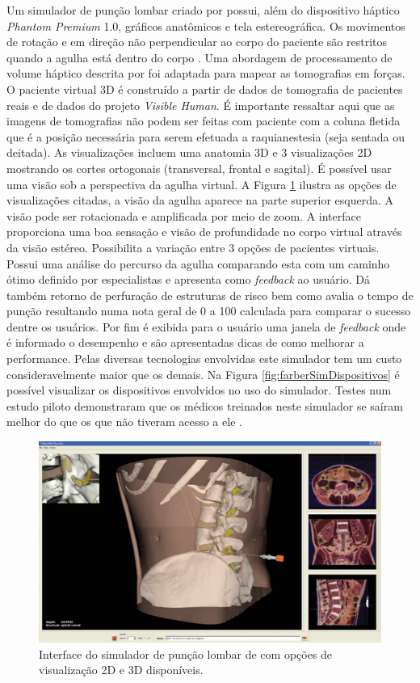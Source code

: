 Um simulador de punção lombar criado por \textcite{Farber2008}  possui, além do dispositivo háptico \textit{Phantom Premium} 1.0, gráficos anatômicos e tela estereográfica. Os movimentos de rotação e em direção não perpendicular ao corpo do paciente são restritos quando a agulha está dentro do corpo \cite{Farber2008, Farber2009}. Uma abordagem de processamento de volume háptico descrita por \textcite{Lundin2005} foi adaptada para mapear as tomografias em forças. O paciente virtual 3D é construído a partir de dados de tomografia de pacientes reais e de dados do projeto \textit{Visible Human}. É importante ressaltar aqui que as imagens de tomografias não podem ser feitas com paciente com a coluna fletida que é a posição necessária para serem efetuada a raquianestesia (seja sentada ou deitada).  As visualizações incluem uma anatomia 3D e 3 visualizações 2D mostrando os cortes ortogonais (transversal, frontal e sagital). É possível usar uma visão sob a perspectiva da agulha virtual. A Figura \ref{fig:farberSimVisual} ilustra as opções de visualizações citadas, a visão da agulha aparece na parte superior esquerda. A visão pode ser rotacionada e amplificada por meio de zoom. A interface proporciona uma boa sensação e visão de  profundidade no corpo virtual através da visão estéreo. Possibilita a variação entre 3 opções de pacientes virtuais. Possui uma análise do percurso da agulha comparando esta com um caminho ótimo definido por especialistas e apresenta como \textit{feedback} ao usuário. Dá também retorno de perfuração de estruturas de risco bem como avalia o tempo de punção resultando numa nota geral de 0 a 100 calculada para comparar o sucesso dentre os usuários. Por fim é exibida para o usuário uma janela de \textit{feedback} onde é informado o desempenho e são apresentadas dicas de como melhorar a performance. Pelas diversas tecnologias envolvidas este simulador tem um custo consideravelmente maior que os demais. Na Figura \ref{fig:farberSimDispositivos} é possível visualizar os dispositivos envolvidos no uso do simulador. Testes num estudo piloto demonstraram que os médicos treinados neste simulador se saíram melhor do que os que não tiveram acesso a ele \cite{Farber2009}.

\begin{figure}[ht!]
    \centering
    \includegraphics[width=0.8\linewidth]{capitulos/figuras/farberSimVisual.png} 
    \caption{Interface do simulador de punção lombar de \textcite{Farber2009} com opções de visualização 2D e 3D disponíveis.}
    \label{fig:farberSimVisual}
\end{figure}

